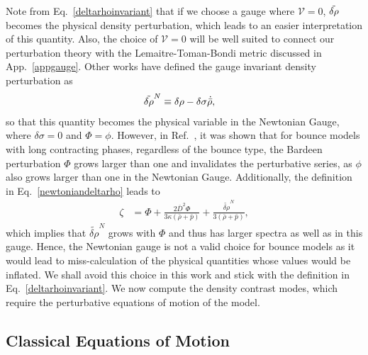 \documentclass[a4paper,11pt]{article}
\begin{document}
Note from Eq.~\eqref{deltarhoinvariant} that if we choose a gauge where $\mathcal{V} =0$, $\Tilde{\delta\rho}$ becomes the physical density perturbation, which leads to an easier interpretation of this quantity. Also, the choice of $\mathcal{V} =0$ will be well suited to connect our perturbation theory with the Lemaitre-Toman-Bondi metric discussed in App.~\ref{appgauge}.  Other works have defined the gauge invariant density perturbation as
\begin{align}
	\label{newtoniandeltarho}
	\Tilde{\delta\rho}^{N} & \equiv \delta\rho - \delta\sigma \dot{\Bar{\rho}}
	,\end{align}
so that this quantity becomes the physical variable in the Newtonian Gauge, where $\delta\sigma = 0$ and $\Phi = \phi$. However, in Ref.~\cite{vitenti2012large}, it was shown that for bounce models with long contracting phases, regardless of the bounce type, the Bardeen perturbation $\Phi$ grows larger than one and invalidates the perturbative series, as $\phi$ also grows larger than one in the Newtonian Gauge. Additionally, the definition in Eq.~\eqref{newtoniandeltarho} leads to
\begin{align}
	\zeta & = \Phi + \frac{2\bar{D}^2 \Phi}{3  \kappa (\bar{\rho}+\bar{p})}+  \frac{{\tilde{\delta\rho}^N}} {3(\bar{\rho}+\bar{p})}
	,\end{align}
which implies that $\tilde{\delta\rho}^N$ grows with $\Phi$ and thus has larger spectra
as well as in this gauge. Hence, the Newtonian gauge is not a valid choice for bounce
models as it would lead to miss-calculation of the physical quantities whose values
would be inflated. We shall avoid this choice in this work and stick with the definition
in Eq.~\eqref{deltarhoinvariant}. We now compute the density contrast modes, which
require the perturbative equations of motion of the model.

\subsection{Classical Equations of Motion}
\end{document}
